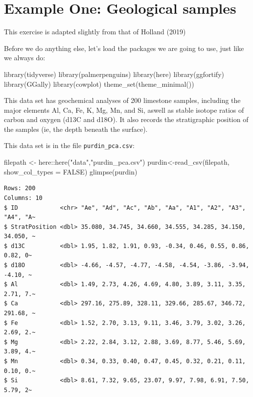 \documentclass[
  letterpaper,
  DIV=11,
  numbers=noendperiod]{scrreprt}
\newenvironment{Shaded}{\begin{snugshade}}{\end{snugshade}}
\newcommand{\AttributeTok}[1]{\textcolor[rgb]{0.40,0.45,0.13}{#1}}
\newcommand{\ConstantTok}[1]{\textcolor[rgb]{0.56,0.35,0.01}{#1}}
\newcommand{\FunctionTok}[1]{\textcolor[rgb]{0.28,0.35,0.67}{#1}}
\newcommand{\NormalTok}[1]{\textcolor[rgb]{0.00,0.23,0.31}{#1}}
\newcommand{\OtherTok}[1]{\textcolor[rgb]{0.00,0.23,0.31}{#1}}
\newcommand{\SpecialCharTok}[1]{\textcolor[rgb]{0.37,0.37,0.37}{#1}}
\newcommand{\StringTok}[1]{\textcolor[rgb]{0.13,0.47,0.30}{#1}}
\begin{document}
\section{Example One: Geological
samples}\label{example-one-geological-samples}

This exercise is adapted slightly from that of Holland (2019)

Before we do anything else, let's load the packages we are going to use,
just like we always do:

\begin{Shaded}
\begin{Highlighting}[]
\FunctionTok{library}\NormalTok{(tidyverse)}
\FunctionTok{library}\NormalTok{(palmerpenguins)}
\FunctionTok{library}\NormalTok{(here)}
\FunctionTok{library}\NormalTok{(ggfortify)}
\FunctionTok{library}\NormalTok{(GGally)}
\FunctionTok{library}\NormalTok{(cowplot)}
\FunctionTok{theme\_set}\NormalTok{(}\FunctionTok{theme\_minimal}\NormalTok{())}
\end{Highlighting}
\end{Shaded}

This data set has geochemical analyses of 200 limestone samples,
including the major elements Al, Ca, Fe, K, Mg, Mn, and Si, aswell as
stable isotope ratios of carbon and oxygen (d13C and d18O). It also
records the stratigraphic position of the samples (ie, the depth beneath
the surface).

This data set is in the file \texttt{purdin\_pca.csv}:

\begin{Shaded}
\begin{Highlighting}[]
\NormalTok{filepath }\OtherTok{\textless{}{-}}\NormalTok{ here}\SpecialCharTok{::}\FunctionTok{here}\NormalTok{(}\StringTok{"data"}\NormalTok{,}\StringTok{"purdin\_pca.csv"}\NormalTok{)}
\NormalTok{purdin}\OtherTok{\textless{}{-}}\FunctionTok{read\_csv}\NormalTok{(filepath, }\AttributeTok{show\_col\_types =} \ConstantTok{FALSE}\NormalTok{)}
\FunctionTok{glimpse}\NormalTok{(purdin)}
\end{Highlighting}
\end{Shaded}

\begin{verbatim}
Rows: 200
Columns: 10
$ ID            <chr> "Ae", "Ad", "Ac", "Ab", "Aa", "A1", "A2", "A3", "A4", "A~
$ StratPosition <dbl> 35.080, 34.745, 34.660, 34.555, 34.285, 34.150, 34.050, ~
$ d13C          <dbl> 1.95, 1.82, 1.91, 0.93, -0.34, 0.46, 0.55, 0.86, 0.82, 0~
$ d18O          <dbl> -4.66, -4.57, -4.77, -4.58, -4.54, -3.86, -3.94, -4.10, ~
$ Al            <dbl> 1.49, 2.73, 4.26, 4.69, 4.80, 3.89, 3.11, 3.35, 2.71, 7.~
$ Ca            <dbl> 297.16, 275.89, 328.11, 329.66, 285.67, 346.72, 291.68, ~
$ Fe            <dbl> 1.52, 2.70, 3.13, 9.11, 3.46, 3.79, 3.02, 3.26, 2.69, 2.~
$ Mg            <dbl> 2.22, 2.84, 3.12, 2.88, 3.69, 8.77, 5.46, 5.69, 3.89, 4.~
$ Mn            <dbl> 0.34, 0.33, 0.40, 0.47, 0.45, 0.32, 0.21, 0.11, 0.10, 0.~
$ Si            <dbl> 8.61, 7.32, 9.65, 23.07, 9.97, 7.98, 6.91, 7.50, 5.79, 2~
\end{verbatim}
\end{document}

